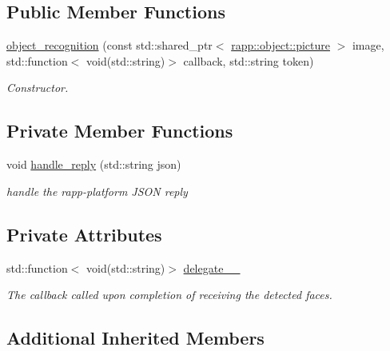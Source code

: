 \subsection*{Public Member Functions}
\begin{DoxyCompactItemize}
\item 
\hyperlink{classrapp_1_1cloud_1_1object__recognition_a75b499e0ffeffaa29f6df4cd0f639cc4}{object\-\_\-recognition} (const std\-::shared\-\_\-ptr$<$ \hyperlink{classrapp_1_1object_1_1picture}{rapp\-::object\-::picture} $>$ image, std\-::function$<$ void(std\-::string)$>$ callback, std\-::string token)
\begin{DoxyCompactList}\small\item\em Constructor. \end{DoxyCompactList}\end{DoxyCompactItemize}
\subsection*{Private Member Functions}
\begin{DoxyCompactItemize}
\item 
void \hyperlink{classrapp_1_1cloud_1_1object__recognition_a9d9276bac84936029ef768aa8aa33f30}{handle\-\_\-reply} (std\-::string json)
\begin{DoxyCompactList}\small\item\em handle the rapp-\/platform J\-S\-O\-N reply \end{DoxyCompactList}\end{DoxyCompactItemize}
\subsection*{Private Attributes}
\begin{DoxyCompactItemize}
\item 
std\-::function$<$ void(std\-::string)$>$ \hyperlink{classrapp_1_1cloud_1_1object__recognition_ad0f3846c9d37f37b9d4c6a38812fbc51}{delegate\-\_\-\-\_\-}
\begin{DoxyCompactList}\small\item\em The callback called upon completion of receiving the detected faces. \end{DoxyCompactList}\end{DoxyCompactItemize}
\subsection*{Additional Inherited Members}


